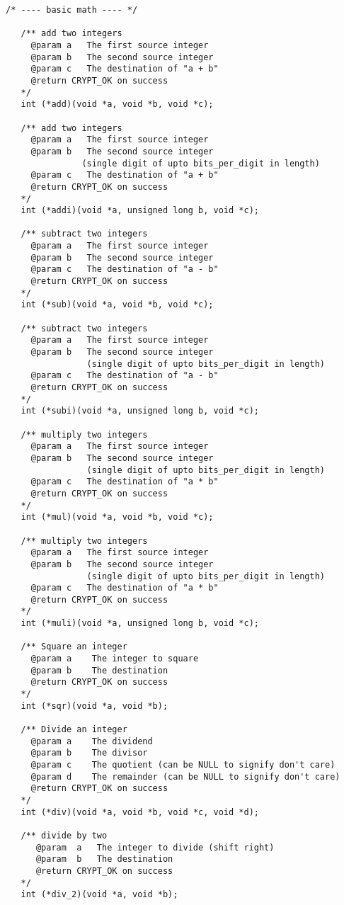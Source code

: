 \documentclass[synpaper]{book}
\begin{document}
\begin{small}
\begin{verbatim}
/* ---- basic math ---- */

   /** add two integers
     @param a   The first source integer
     @param b   The second source integer
     @param c   The destination of "a + b"
     @return CRYPT_OK on success
   */
   int (*add)(void *a, void *b, void *c);

   /** add two integers
     @param a   The first source integer
     @param b   The second source integer
               (single digit of upto bits_per_digit in length)
     @param c   The destination of "a + b"
     @return CRYPT_OK on success
   */
   int (*addi)(void *a, unsigned long b, void *c);

   /** subtract two integers
     @param a   The first source integer
     @param b   The second source integer
     @param c   The destination of "a - b"
     @return CRYPT_OK on success
   */
   int (*sub)(void *a, void *b, void *c);

   /** subtract two integers
     @param a   The first source integer
     @param b   The second source integer
                (single digit of upto bits_per_digit in length)
     @param c   The destination of "a - b"
     @return CRYPT_OK on success
   */
   int (*subi)(void *a, unsigned long b, void *c);

   /** multiply two integers
     @param a   The first source integer
     @param b   The second source integer
                (single digit of upto bits_per_digit in length)
     @param c   The destination of "a * b"
     @return CRYPT_OK on success
   */
   int (*mul)(void *a, void *b, void *c);

   /** multiply two integers
     @param a   The first source integer
     @param b   The second source integer
                (single digit of upto bits_per_digit in length)
     @param c   The destination of "a * b"
     @return CRYPT_OK on success
   */
   int (*muli)(void *a, unsigned long b, void *c);

   /** Square an integer
     @param a    The integer to square
     @param b    The destination
     @return CRYPT_OK on success
   */
   int (*sqr)(void *a, void *b);

   /** Divide an integer
     @param a    The dividend
     @param b    The divisor
     @param c    The quotient (can be NULL to signify don't care)
     @param d    The remainder (can be NULL to signify don't care)
     @return CRYPT_OK on success
   */
   int (*div)(void *a, void *b, void *c, void *d);

   /** divide by two
      @param  a   The integer to divide (shift right)
      @param  b   The destination
      @return CRYPT_OK on success
   */
   int (*div_2)(void *a, void *b);


\end{verbatim}
\end{small}
\end{document}
